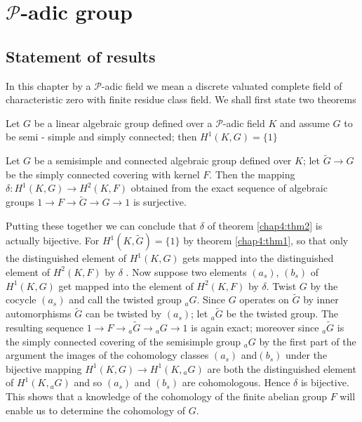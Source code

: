 
\chapter{$\mathscr{P}$-adic group}\label{chap4}


\section{Statement of results}\label{chap4:sec4.1}
\pageoriginale

In this chapter by a $\mathscr{P}$-adic field we mean a discrete
valuated complete field of characteristic zero with finite residue
class field. We shall first state two theorems 

\setcounter{thm}{0}
\begin{thm}\label{chap4:thm1}
Let $G$ be a linear algebraic group defined over a $\mathscr{P}$-adic
field $K$ and assume $G$ to be semi - simple and simply connected;
then $H^1(K,G) = \{ 1 \}$   
\end{thm}

\begin{thm}\label{chap4:thm2}
Let $G$ be a semisimple and connected algebraic group defined over $K$;
 let $\tilde G \rightarrow G$ be the simply connected covering with
kernel $F$. Then the mapping $\delta : H^1 (K, G) \rightarrow
H^2(K,F)$ obtained from the exact sequence of algebraic groups $1
\rightarrow F \rightarrow \tilde{G} \rightarrow G \rightarrow 1$ is
surjective.  
\end{thm}

Putting these together we can conclude that $\delta$ of theorem \ref{chap4:thm2} is
actually bijective. For $H^1 (K, \tilde{G}) = \{ 1 \}$ by theorem \ref{chap4:thm1},
so that only the distinguished element of $H^1 (K,G)$ gets mapped into
the distinguished element of $H^2 (K,F)$ by $\delta$ . Now suppose two
elements $(a_s)$, $(b_s)$ of $H^1 (K,G)$ get mapped into the element
of $H^2(K,F)$ by $\delta$.  Twist $G$ by the cocycle $(a_s)$ and call
the twisted group ${}_aG$. Since $G$ operates on $\tilde {G}$ by inner
automorphisms $\tilde {G}$ can be twisted by $(a_s)$; let ${}_a
\tilde{G}$ be the twisted group. The resulting sequence $1 \rightarrow 
F \rightarrow {}_a \tilde{G} \rightarrow {}_a G \rightarrow 1$ is again
exact; moreover since ${}_a \tilde{G}$ is the simply connected
covering of the semisimple group ${}_aG$ by the first part of the
argument the images of the cohomology classes $(a_s)$
and\pageoriginale $(b_s)$ 
under the bijective mapping $H^1(K,G) \rightarrow H^1 (K,{}_a G)$ are
both the distinguished element of $H^1 (K,{}_a G)$ and so $(a_s)$ and
$(b_s)$ are cohomologous. Hence $\delta$ is bijective. This shows that
a knowledge of the cohomology of the finite abelian group $F$ will
enable us to determine the cohomology of $G$. 

